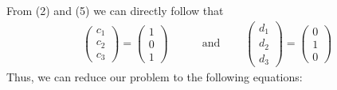\documentclass{article}
\begin{document}
        From (2) and (5) we can directly follow that
        \begin{align}
            \left(\begin{matrix} c_1\\c_2\\c_3 \end{matrix}\right) = \left(\begin{matrix} 1\\0\\1 \end{matrix}\right)\ \ \ \ \ \ \ \ \ \ 
            &\text{and}\ \ \ \ \ \ \ \ \ \ 
            \left(\begin{matrix} d_1\\d_2\\d_3 \end{matrix}\right) = \left(\begin{matrix} 0\\1\\0 \end{matrix}\right)
        \end{align}
        Thus, we can reduce our problem to the following equations:
\end{document}
